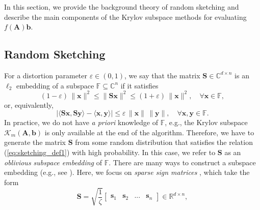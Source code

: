 \documentclass[smallextended]{svjour3}
\renewcommand{\vec}[1]{\mathbf{#1}}
\newcommand{\mat}[1]{\mathbf{#1}}
\newcommand{\inner}[1]{\langle #1 \rangle}
\newcommand{\norm}[1]{\| #1 \|}
\begin{document}
In this section, we provide the background theory of random sketching and describe the main components of the Krylov subspace methods for evaluating $f(\mat{A}) \vec{b}$.

\subsection{Random Sketching}
\label{subsec:sketching}

For a distortion parameter $\varepsilon \in (0, 1)$, we say that the matrix $\mat{S} \in \mathbb{C}^{d \times n}$ is an $\ell_2$ embedding of a subspace $\mathbb{F} \subseteq \mathbb{C}^n$ if it satisfies
\begin{equation}
\label{eq:sketching_def1}
(1 - \varepsilon) \, \norm{\vec{x}}^2 \leq \norm{\mat{S}\vec{x} }^2 \leq (1 + \varepsilon) \, \norm{\vec{x}}^2, \quad \forall \vec{x} \in \mathbb{F},
\end{equation}
or, equivalently,
\begin{equation}
\label{eq:sketching_def2}
|\inner{\mat{S}\vec{x}, \mat{S}\vec{y}} - \inner{\vec{x}, \vec{y}}| \leq \varepsilon \, \norm{\vec{x}} \, \norm{\vec{y}}, \quad \forall \vec{x},\vec{y} \in \mathbb{F}.
\end{equation}
In practice, we do not have \textit{a priori} knowledge of $\mathbb{F}$, e.g., the Krylov subspace $\mathcal{K}_m(\mat{A}, \vec{b})$ is only available at the end of the algorithm. Therefore, we have to generate the matrix $\mat{S}$ from some random distribution that satisfies the relation (\ref{eq:sketching_def1}) with high probability. In this case, we refer to $\mat{S}$ as an \textit{oblivious subspace embedding} of $\mathbb{F}$. There are many ways to construct a subspace embedding (e.g., see \cite[Sections 8 and 9]{martinsson_randomized_2020}). Here, we focus on \textit{sparse sign matrices} \cite{cohen_nearly_2016,tropp_streaming_2019,woodruff_sketching_2014}, which take the form
\begin{equation}
\label{eq:sparse_sign_sketch}
\mat{S} = \sqrt{\frac{1}{\zeta}} \begin{bmatrix} \vec{s}_1 & \vec{s}_2 & ... & \vec{s}_n \end{bmatrix} \in \mathbb{R}^{d \times n},
\end{equation}
\end{document}
